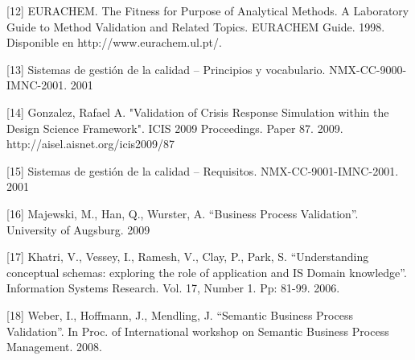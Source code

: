 [12] EURACHEM. The Fitness for Purpose of Analytical Methods. A Laboratory Guide to Method Validation and Related Topics. EURACHEM Guide. 1998. Disponible en http://www.eurachem.ul.pt/. 

[13] Sistemas de gestión de la calidad – Principios y vocabulario. NMX-CC-9000-IMNC-2001. 2001

[14] Gonzalez, Rafael A. "Validation of Crisis Response Simulation within the Design Science Framework". ICIS 2009 Proceedings. Paper 87. 2009. http://aisel.aisnet.org/icis2009/87 

[15] Sistemas de gestión de la calidad – Requisitos. NMX-CC-9001-IMNC-2001. 2001 

[16] Majewski, M., Han, Q., Wurster, A. “Business Process Validation”. University of Augsburg. 2009 

[17] Khatri, V., Vessey, I., Ramesh, V., Clay, P., Park, S. “Understanding conceptual schemas: exploring the role of application and IS Domain knowledge”. Information Systems Research. Vol. 17, Number 1. Pp: 81-99. 2006. 

[18] Weber, I., Hoffmann, J., Mendling, J. “Semantic Business Process Validation”. In Proc. of International workshop on Semantic Business Process Management. 2008.